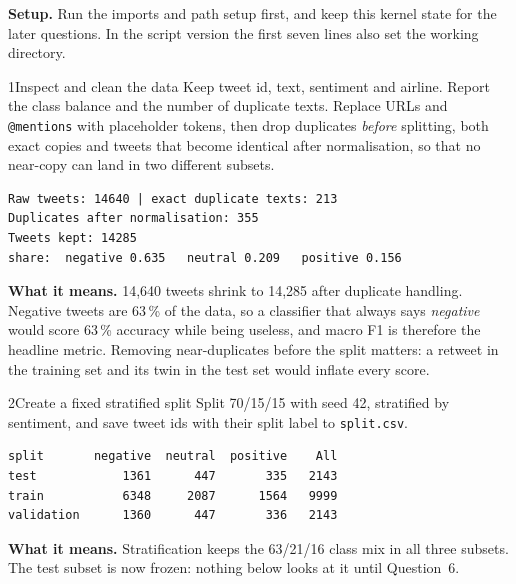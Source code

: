 \textbf{Setup.} Run the imports and path setup first, and keep this kernel state for the later questions. In the script version the first seven lines also set the working directory.



\begin{labquestion}{1}{Inspect and clean the data}
Keep tweet id, text, sentiment and airline. Report the class balance and the number of duplicate texts. Replace URLs and \texttt{@mentions} with placeholder tokens, then drop duplicates \emph{before} splitting, both exact copies and tweets that become identical after normalisation, so that no near-copy can land in two different subsets.
\end{labquestion}
\begin{labanswer}


\begin{refoutput}
\begin{lstlisting}[style=utpterminal]
Raw tweets: 14640 | exact duplicate texts: 213
Duplicates after normalisation: 355
Tweets kept: 14285
share:  negative 0.635   neutral 0.209   positive 0.156
\end{lstlisting}
\end{refoutput}

\textbf{What it means.} 14,640 tweets shrink to 14,285 after duplicate handling. Negative tweets are 63\,\% of the data, so a classifier that always says \emph{negative} would score 63\,\% accuracy while being useless, and macro F1 is therefore the headline metric. Removing near-duplicates before the split matters: a retweet in the training set and its twin in the test set would inflate every score.
\end{labanswer}

\begin{labquestion}{2}{Create a fixed stratified split}
Split 70/15/15 with seed 42, stratified by sentiment, and save tweet ids with their split label to \texttt{split.csv}.
\end{labquestion}
\begin{labanswer}

\begin{refoutput}
\begin{lstlisting}[style=utpterminal]
split       negative  neutral  positive    All
test            1361      447       335   2143
train           6348     2087      1564   9999
validation      1360      447       336   2143
\end{lstlisting}
\end{refoutput}

\textbf{What it means.} Stratification keeps the 63/21/16 class mix in all three subsets. The test subset is now frozen: nothing below looks at it until Question~6.
\end{labanswer}

